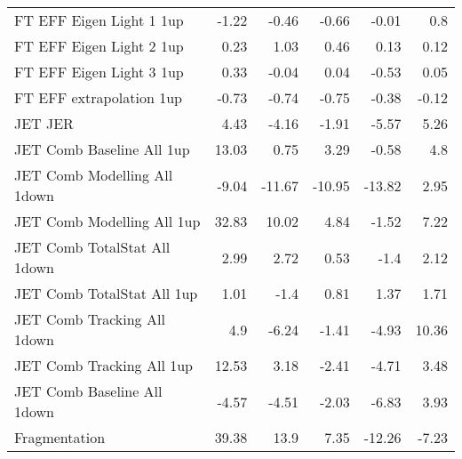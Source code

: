 \begin{table}[htbp]
{\begin{tabular}{lrrrrr}
FT EFF Eigen Light 1  1up    & -1.22            & -0.46              & -0.66              & -0.01              & 0.8                \\
FT EFF Eigen Light 2  1up    & 0.23             & 1.03               & 0.46               & 0.13               & 0.12               \\
FT EFF Eigen Light 3  1up    & 0.33             & -0.04              & 0.04               & -0.53              & 0.05               \\
FT EFF extrapolation  1up      & -0.73            & -0.74              & -0.75              & -0.38              & -0.12              \\
JET JER                           & 4.43             & -4.16              & -1.91              & -5.57              & 5.26               \\
JET Comb Baseline All  1up    & 13.03            & 0.75               & 3.29               & -0.58              & 4.8                \\
JET Comb Modelling All  1down & -9.04            & -11.67             & -10.95             & -13.82             & 2.95               \\
JET Comb Modelling All  1up   & 32.83            & 10.02              & 4.84               & -1.52              & 7.22               \\
JET Comb TotalStat All  1down & 2.99             & 2.72               & 0.53               & -1.4               & 2.12               \\
JET Comb TotalStat All  1up   & 1.01             & -1.4               & 0.81               & 1.37               & 1.71               \\
JET Comb Tracking All  1down  & 4.9              & -6.24              & -1.41              & -4.93              & 10.36              \\
JET Comb Tracking All  1up    & 12.53            & 3.18               & -2.41              & -4.71              & 3.48               \\
JET Comb Baseline All  1down  & -4.57            & -4.51              & -2.03              & -6.83              & 3.93               \\
Fragmentation                             & 39.38            & 13.9               & 7.35               & -12.26             & -7.23              \\
\end{tabular}}
\end{table}




